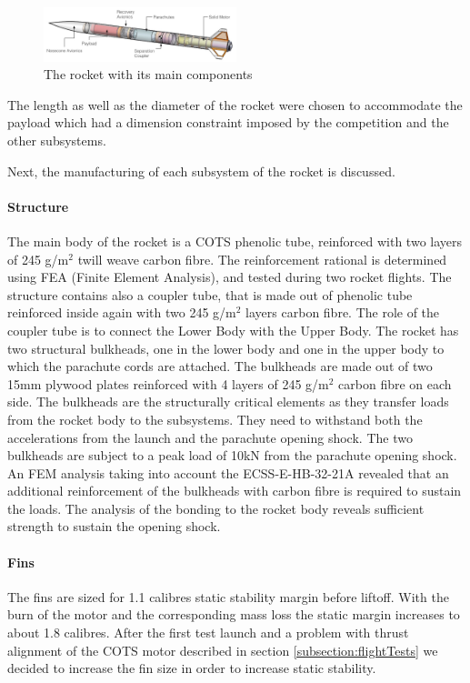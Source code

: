 \begin{figure}[h!]
\centering
\includegraphics[width=0.5\textwidth]{img/rocket_sw_annotated.jpg}
\caption{The rocket with its main components}
\label{f:rocket_adnoted}
\end{figure}


The length as well as the diameter of the rocket were chosen to accommodate the payload which had a dimension constraint imposed by the competition and the other subsystems.


Next, the manufacturing of each subsystem of the rocket is discussed.


\paragraph{Structure}
\hfill \break
The main body of the rocket is a COTS phenolic tube, reinforced with two layers of 245 g/m$^2$ twill weave carbon fibre. The reinforcement rational is determined using FEA (Finite Element Analysis), and tested during two rocket flights.
The structure contains also a coupler tube, that is made out of phenolic tube reinforced inside again with two 245 g/m$^2$ layers carbon fibre.
The role of the coupler tube is to connect the Lower Body with the Upper Body.
The rocket has two structural bulkheads, one in the lower body and one in the upper body to which the parachute cords are attached. The bulkheads are made out of two 15mm plywood plates reinforced with 4 layers of 245 g/m$^2$ carbon fibre on each side.  The bulkheads are the structurally critical elements as they transfer loads from the rocket body to the subsystems. They need to withstand both the accelerations from the launch and the parachute opening shock. 
The two bulkheads are subject to a peak load of 10kN from the parachute opening shock. An FEM analysis taking into account the  ECSS-E-HB-32-21A \cite{ecss} revealed that an additional reinforcement of the bulkheads with carbon fibre is required to sustain the loads. The analysis of the bonding to the rocket body reveals sufficient strength to sustain the opening shock.



\paragraph{Fins}
\hfill \break
The fins are sized for 1.1 calibres static stability margin before liftoff.
With the burn of the motor and the corresponding mass loss the static margin increases to about 1.8 calibres.
After the first test launch and a problem with thrust alignment of the COTS motor described in section \ref{subsection:flightTests} we decided to increase the fin size in order to increase static stability.

